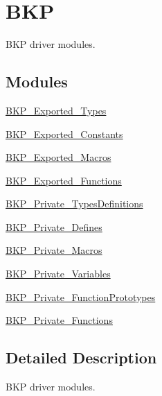 \hypertarget{group___b_k_p}{}\section{B\+KP}
\label{group___b_k_p}


B\+KP driver modules.  


\subsection*{Modules}
\begin{DoxyCompactItemize}
\item 
\hyperlink{group___b_k_p___exported___types}{B\+K\+P\+\_\+\+Exported\+\_\+\+Types}
\item 
\hyperlink{group___b_k_p___exported___constants}{B\+K\+P\+\_\+\+Exported\+\_\+\+Constants}
\item 
\hyperlink{group___b_k_p___exported___macros}{B\+K\+P\+\_\+\+Exported\+\_\+\+Macros}
\item 
\hyperlink{group___b_k_p___exported___functions}{B\+K\+P\+\_\+\+Exported\+\_\+\+Functions}
\item 
\hyperlink{group___b_k_p___private___types_definitions}{B\+K\+P\+\_\+\+Private\+\_\+\+Types\+Definitions}
\item 
\hyperlink{group___b_k_p___private___defines}{B\+K\+P\+\_\+\+Private\+\_\+\+Defines}
\item 
\hyperlink{group___b_k_p___private___macros}{B\+K\+P\+\_\+\+Private\+\_\+\+Macros}
\item 
\hyperlink{group___b_k_p___private___variables}{B\+K\+P\+\_\+\+Private\+\_\+\+Variables}
\item 
\hyperlink{group___b_k_p___private___function_prototypes}{B\+K\+P\+\_\+\+Private\+\_\+\+Function\+Prototypes}
\item 
\hyperlink{group___b_k_p___private___functions}{B\+K\+P\+\_\+\+Private\+\_\+\+Functions}
\end{DoxyCompactItemize}


\subsection{Detailed Description}
B\+KP driver modules. 

